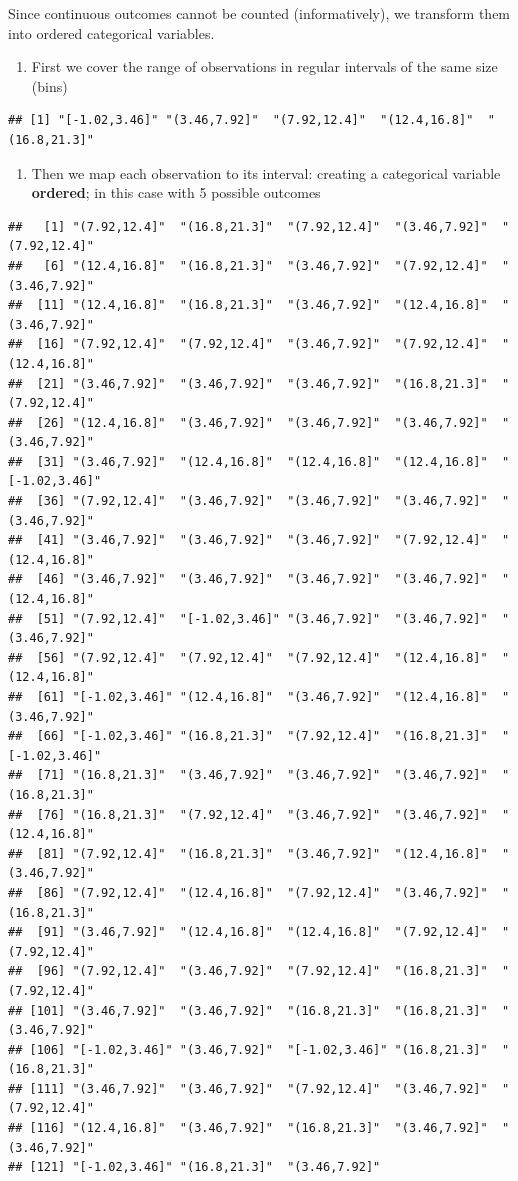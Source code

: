 \documentclass[
]{book}
\providecommand{\tightlist}{%
  \setlength{\itemsep}{0pt}\setlength{\parskip}{0pt}}
\begin{document}
Since continuous outcomes cannot be counted (informatively), we transform them into ordered categorical variables.

\begin{enumerate}
\def\labelenumi{\arabic{enumi})}
\tightlist
\item
  First we cover the range of observations in regular intervals of the same size (bins)
\end{enumerate}

\begin{verbatim}
## [1] "[-1.02,3.46]" "(3.46,7.92]"  "(7.92,12.4]"  "(12.4,16.8]"  "(16.8,21.3]"
\end{verbatim}

\begin{enumerate}
\def\labelenumi{\arabic{enumi})}
\setcounter{enumi}{1}
\tightlist
\item
  Then we map each observation to its interval: creating a categorical variable \textbf{ordered}; in this case with 5 possible outcomes
\end{enumerate}

\begin{verbatim}
##   [1] "(7.92,12.4]"  "(16.8,21.3]"  "(7.92,12.4]"  "(3.46,7.92]"  "(7.92,12.4]" 
##   [6] "(12.4,16.8]"  "(16.8,21.3]"  "(3.46,7.92]"  "(7.92,12.4]"  "(3.46,7.92]" 
##  [11] "(12.4,16.8]"  "(16.8,21.3]"  "(3.46,7.92]"  "(12.4,16.8]"  "(3.46,7.92]" 
##  [16] "(7.92,12.4]"  "(7.92,12.4]"  "(3.46,7.92]"  "(7.92,12.4]"  "(12.4,16.8]" 
##  [21] "(3.46,7.92]"  "(3.46,7.92]"  "(3.46,7.92]"  "(16.8,21.3]"  "(7.92,12.4]" 
##  [26] "(12.4,16.8]"  "(3.46,7.92]"  "(3.46,7.92]"  "(3.46,7.92]"  "(3.46,7.92]" 
##  [31] "(3.46,7.92]"  "(12.4,16.8]"  "(12.4,16.8]"  "(12.4,16.8]"  "[-1.02,3.46]"
##  [36] "(7.92,12.4]"  "(3.46,7.92]"  "(3.46,7.92]"  "(3.46,7.92]"  "(3.46,7.92]" 
##  [41] "(3.46,7.92]"  "(3.46,7.92]"  "(3.46,7.92]"  "(7.92,12.4]"  "(12.4,16.8]" 
##  [46] "(3.46,7.92]"  "(3.46,7.92]"  "(3.46,7.92]"  "(3.46,7.92]"  "(12.4,16.8]" 
##  [51] "(7.92,12.4]"  "[-1.02,3.46]" "(3.46,7.92]"  "(3.46,7.92]"  "(3.46,7.92]" 
##  [56] "(7.92,12.4]"  "(7.92,12.4]"  "(7.92,12.4]"  "(12.4,16.8]"  "(12.4,16.8]" 
##  [61] "[-1.02,3.46]" "(12.4,16.8]"  "(3.46,7.92]"  "(12.4,16.8]"  "(3.46,7.92]" 
##  [66] "[-1.02,3.46]" "(16.8,21.3]"  "(7.92,12.4]"  "(16.8,21.3]"  "[-1.02,3.46]"
##  [71] "(16.8,21.3]"  "(3.46,7.92]"  "(3.46,7.92]"  "(3.46,7.92]"  "(16.8,21.3]" 
##  [76] "(16.8,21.3]"  "(7.92,12.4]"  "(3.46,7.92]"  "(3.46,7.92]"  "(12.4,16.8]" 
##  [81] "(7.92,12.4]"  "(16.8,21.3]"  "(3.46,7.92]"  "(12.4,16.8]"  "(3.46,7.92]" 
##  [86] "(7.92,12.4]"  "(12.4,16.8]"  "(7.92,12.4]"  "(3.46,7.92]"  "(16.8,21.3]" 
##  [91] "(3.46,7.92]"  "(12.4,16.8]"  "(12.4,16.8]"  "(7.92,12.4]"  "(7.92,12.4]" 
##  [96] "(7.92,12.4]"  "(3.46,7.92]"  "(7.92,12.4]"  "(16.8,21.3]"  "(7.92,12.4]" 
## [101] "(3.46,7.92]"  "(3.46,7.92]"  "(16.8,21.3]"  "(16.8,21.3]"  "(3.46,7.92]" 
## [106] "[-1.02,3.46]" "(3.46,7.92]"  "[-1.02,3.46]" "(16.8,21.3]"  "(16.8,21.3]" 
## [111] "(3.46,7.92]"  "(3.46,7.92]"  "(7.92,12.4]"  "(3.46,7.92]"  "(7.92,12.4]" 
## [116] "(12.4,16.8]"  "(3.46,7.92]"  "(16.8,21.3]"  "(3.46,7.92]"  "(3.46,7.92]" 
## [121] "[-1.02,3.46]" "(16.8,21.3]"  "(3.46,7.92]"
\end{verbatim}
\end{document}
